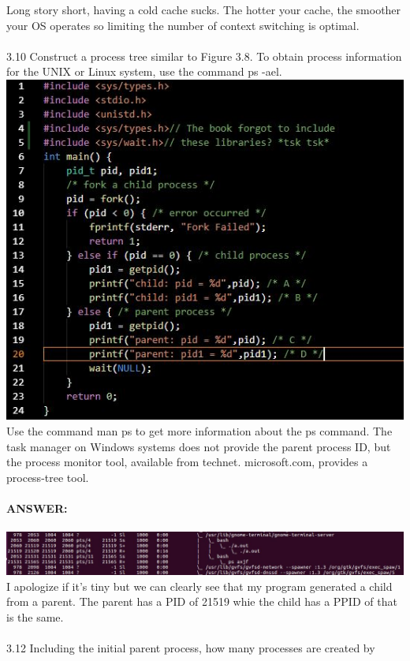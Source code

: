 \documentclass[12pt]{article}
\begin{document}
\noindent Long story short, having a cold cache sucks. The hotter your cache, the smoother 
your OS operates so limiting the number of context switching is optimal.\\\\
3.10 Construct a process tree similar to Figure 3.8. To obtain process information
for the UNIX or Linux system, use the command ps -ael.\\
\includegraphics[scale = .7]{code.jpg}\\
Use the command man ps to get more information about the ps command.
The task manager on Windows systems does not provide the
parent process ID, but the process monitor tool, available from technet.
microsoft.com, provides a process-tree tool.\\\\
\textbf{ANSWER: }\\\\
\includegraphics[width=1\textwidth]{tree.jpg}\\
I apologize if it's tiny but we can clearly see that my program generated a child 
from a parent. The parent has a PID of 21519 whie the child has a PPID of that is 
the same. \\\\
3.12 Including the initial parent process, how many processes are created by
\end{document}

